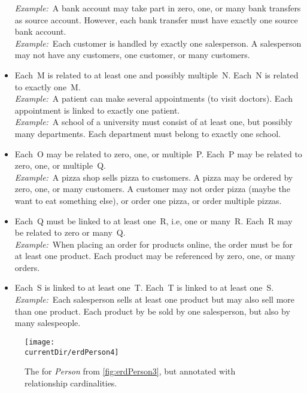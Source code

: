 \begin{itemize}
\emph{Example:}~A bank account may take part in zero, one, or many bank transfers as source account.
However, each bank transfer must have exactly one source bank account.~\cite{MA2006MAC:DMERDED}\\%
\emph{Example:}~Each customer is handled by exactly one salesperson.
A salesperson may not have any customers, one customer, or many customers.~\cite{T2025CDBMS:ERM}%
%
\item {} Each~M is related to at least one and possibly multiple~N. Each~N is related to exactly one~M.~\cite{BS2023G:EDFAHMSCFN}\\%
\emph{Example:}~A patient can make several appointments (to visit doctors).
Each appointment is linked to exactly one patient.~\cite{BS2023G:EDFAHMSCFN}\\%
\emph{Example:}~A school of a university must consist of at least one, but possibly many departments.
Each department must belong to exactly one school.~\cite{R2024CDS:E}%
%
\item {} Each~O may be related to zero, one, or multiple~P. Each~P may be related to zero, one, or multiple~Q.\\%
\emph{Example:}~A pizza shop sells pizza to customers.
A pizza may be ordered by zero, one, or many customers.
A customer may not order pizza (maybe the want to eat something else), or order one pizza, or order multiple pizzas.~\cite{FCC2016D:CFNRSAHTRD}%
%
\item {} Each~Q must be linked to at least one~R, i.e, one or many~R. Each~R may be related to zero or many~Q.~\cite{BS2023G:CFNIERD}\\%
\emph{Example:}~When placing an order for products online, the order must be for at least one product.
Each product may be referenced by zero, one, or many orders.~\cite{BS2023G:CFNIERD}%
%
\item {} Each~S is linked to at least one~T. Each~T is linked to at least one~S.~\cite{T2025CDBMS:ERM}\\%
\emph{Example:}~Each salesperson sells at least one product but may also sell more than one product.
Each product by be sold by one salesperson, but also by many salespeople.~\cite{T2025CDBMS:ERM}
%
\end{itemize}%
%
\FloatBarrier%
%
\begin{figure}%
\centering%
\texttt{[image: \\currentDir/erdPerson4]}%
\caption{The  for \emph{Person} from \cref{fig:erdPerson3}, but annotated with relationship cardinalities.}%
\label{fig:erdPerson4}%
\end{figure}%


